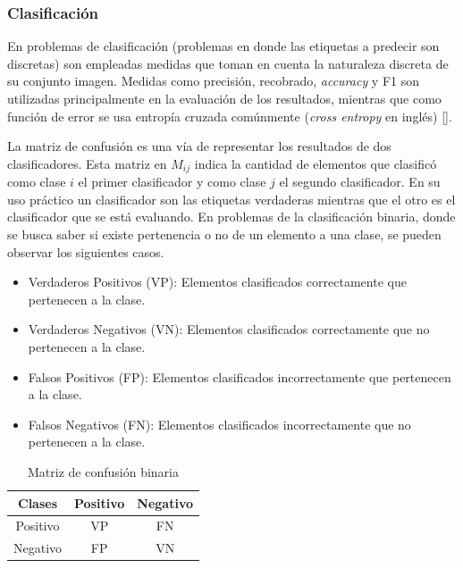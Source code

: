 \subsubsection{Clasificación}

En problemas de clasificación (problemas en donde las etiquetas a predecir son discretas) 
son empleadas medidas que toman en cuenta la naturaleza discreta de su conjunto imagen.
Medidas como precisión, recobrado, \emph{accuracy} y F1 son utilizadas principalmente en la 
evaluación de los resultados, mientras que como función de error se usa entropía cruzada comúnmente 
(\emph{cross entropy} en inglés) [\cite{grandini2020metrics}].

La matriz de confusión es una vía de representar los resultados de dos clasificadores. Esta matriz en $M_{ij}$ 
indica la cantidad de elementos que clasificó como clase $i$ el primer clasificador y
como clase $j$ el segundo clasificador. En su uso práctico
un clasificador son las etiquetas verdaderas mientras que el otro es el clasificador que se está evaluando. 
En problemas de la clasificación binaria, donde se busca saber si existe pertenencia o no de un elemento a una clase,
se pueden observar los siguientes casos.

\begin{itemize}
	\item Verdaderos Positivos (VP): Elementos clasificados correctamente que pertenecen a la clase.
	\item Verdaderos Negativos (VN): Elementos clasificados correctamente que no pertenecen a la clase.
	\item Falsos Positivos (FP): Elementos clasificados incorrectamente que pertenecen a la clase.
	\item Falsos Negativos (FN): Elementos clasificados incorrectamente que no pertenecen a la clase.
\end{itemize}

\begin{table}[h!]
	\begin{center}
		\begin{tabular}{|c|c|c|} \hline
		Clases		& Positivo	& Negativo  \\ \hline
		Positivo	& VP  		& FN		\\ \hline
		Negativo	& FP		& VN		\\ \hline
		\end{tabular}
	\caption{Matriz de confusión binaria}\label{fig:confusion_matrix}
	\end{center}
\end{table}

